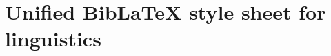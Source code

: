 \documentclass{article}
\begin{document}
\section*{Unified BibLaTeX style sheet for linguistics}

\nocite{*}

\printbibliography[heading=none]
\end{document}
